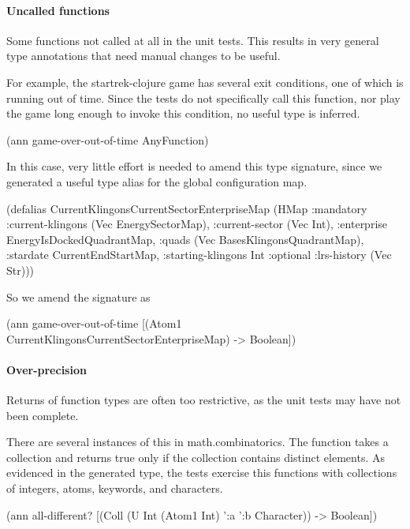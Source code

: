 \paragraph{Uncalled functions}
Some functions not called at all in the unit tests.
This results in very general type annotations that need
manual changes to be useful.

For example, the startrek-clojure game has several exit
conditions, one of which is running out of time.
Since the tests do not specifically call this function,
nor play the game long enough to invoke this condition,
no useful type is inferred.

\begin{cljlisting}
(ann game-over-out-of-time AnyFunction)
\end{cljlisting}

In this case, very little effort is needed to amend this
type signature, since we generated a useful type alias
for the global configuration map.

\begin{cljlisting}
(defalias CurrentKlingonsCurrentSectorEnterpriseMap
  (HMap :mandatory
    {:current-klingons (Vec EnergySectorMap),
     :current-sector (Vec Int), 
     :enterprise EnergyIsDockedQuadrantMap,
     :quads (Vec BasesKlingonsQuadrantMap), 
     :stardate CurrentEndStartMap,
     :starting-klingons Int}
    :optional {:lrs-history (Vec Str)}))
\end{cljlisting}

So we amend the signature as

\begin{cljlisting}
(ann game-over-out-of-time
  [(Atom1 CurrentKlingonsCurrentSectorEnterpriseMap) 
   -> Boolean])
\end{cljlisting}


\paragraph{Over-precision}
Returns of function types are often too restrictive, as the unit
tests may have not been complete.

There are several instances of this in math.combinatorics.
The  function
takes a collection and returns true only if the collection
contains distinct elements.
As evidenced in the generated type, the tests exercise
this functions with collections of integers, atoms,
keywords, and characters.

\begin{cljlisting}
(ann all-different?
  [(Coll (U Int (Atom1 Int) ':a ':b Character)) 
   -> Boolean])
\end{cljlisting}

